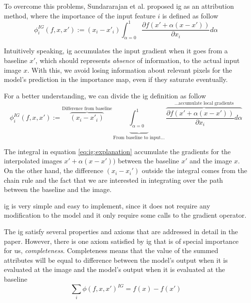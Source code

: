 To overcome this problems, Sundararajan et al. proposed \gls{ig} as an attribution method, where the importance of the input feature $i$ is defined as follow
\begin{equation}
  \phi^{IG}_i(f, x, x') := (x_{i} - x'_{i})\int_{\alpha=0}^1\frac{\partial f(x'+\alpha (x - x'))}{\partial x_i}{d\alpha}
  \label{eq:ig:definition}
\end{equation}

Intuitively speaking, \gls{ig} accumulates the input gradient when it goes from a baseline $x'$, which should represents \textit{absence} of information, to the actual input image $x$. With this, we avoid losing information about relevant pixels for the model's prediction in the importance map, even if they saturate eventually.

For a better understanding, we can divide the \gls{ig} definition as follow
\begin{equation}
  \phi^{IG}_i(f, x, x') := \overbrace{(x_{i} - x'_{i})}^\text{Difference from baseline}
  \underbrace{\int_{\alpha=0}^1}_\text{From baseline to input...}
  \overbrace{\frac{\partial f(x'+\alpha (x - x'))}{\partial x_i}{d\alpha}}^\text{…accumulate local gradients}
  \label{eq:ig:explanation}
\end{equation}

The integral in equation \ref{eq:ig:explanation} accumulate the gradients for the interpolated images $x'+\alpha (x - x'))$ between the baseline $x'$ and the image $x$. On the other hand, the difference $(x_i - x_i')$ outside the integral comes from the chain rule and the fact that we are interested in integrating over the path between the baseline and the image.

\gls{ig} is very simple and easy to implement, since it does not require any modification to the model and it only require some calls to the gradient operator.

The \gls{ig} satisfy several properties and axioms that are addressed in detail in the paper. However, there is one axiom satisfied by \gls{ig} that is of special importance for us, \textit{completeness}. Completeness means that the value of the summed attributes will be equal to difference between the model's output when it is evaluated at the image and the model's output when it is evaluated at the baseline
\begin{equation}
  \sum_i \phi(f, x, x')^{IG} = f(x) - f(x')
  \label{eq:ig_completeness}
\end{equation}

